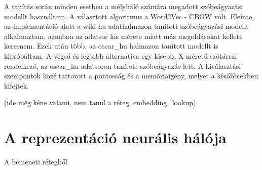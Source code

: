 A tanítás során minden esetben a mélyháló számára megadott szóbeágyazási modellt használtam. A választott algoritmus a Word2Vec - CBOW volt. Eleinte, az implementáció alatt a wiki-hu adathalmazon tanított szóbeágyazási modellt alkalmaztam, azonban az adatsor kis mérete miatt más megoldásokat kellett keresnem.  Ezek után több, az oscar\_hu halmazon tanított modellt is kipróbáltam. A végső és legjobb alternatíva egy kisebb, X méretű szótárral rendelkező, az oscar\_hu adatsoron tanított szóbeágyazás lett. A kiválasztási szempontok közé tartozott a pontosság és a memóriaigény, melyet a későbbiekben kifejtek.

(ide még kéne valami, nem tanul a réteg, embedding\_lookup)

\section{A reprezentáció neurális hálója}
A bemeneti rétegből
